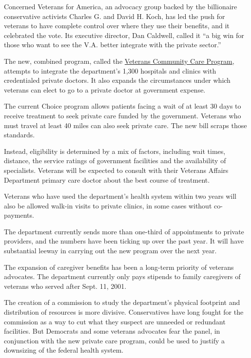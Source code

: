 Concerned Veterans for America, an advocacy group backed by the
billionaire conservative activists Charles G. and David H. Koch, has led
the push for veterans to have complete control over where they use their
benefits, and it celebrated the vote. Its executive director, Dan
Caldwell, called it ``a big win for those who want to see the V.A.
better integrate with the private sector.''

The new, combined program, called the
\href{https://veterans.house.gov/uploadedfiles/va_mission_act_summary.pdf}{Veterans
Community Care Program}, attempts to integrate the department's 1,300
hospitals and clinics with credentialed private doctors. It also expands
the circumstances under which veterans can elect to go to a private
doctor at government expense.

The current Choice program allows patients facing a wait of at least 30
days to receive treatment to seek private care funded by the government.
Veterans who must travel at least 40 miles can also seek private care.
The new bill scraps those standards.

Instead, eligibility is determined by a mix of factors, including wait
times, distance, the service ratings of government facilities and the
availability of specialists. Veterans will be expected to consult with
their Veterans Affairs Department primary care doctor about the best
course of treatment.

Veterans who have used the department's health system within two years
will also be allowed walk-in visits to private clinics, in some cases
without co-payments.

The department currently sends more than one-third of appointments to
private providers, and the numbers have been ticking up over the past
year. It will have substantial leeway in carrying out the new program
over the next year.

The expansion of caregiver benefits has been a long-term priority of
veterans advocates. The department currently only pays stipends to
family caregivers of veterans who served after Sept. 11, 2001.

The creation of a commission to study the department's physical
footprint and distribution of resources is more divisive. Conservatives
have long fought for the commission as a way to cut what they suspect
are unneeded or redundant facilities. But Democrats and some veterans
advocates fear the panel, in conjunction with the new private care
program, could be used to justify a downsizing of the federal health
system.

